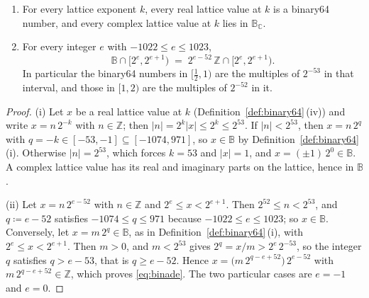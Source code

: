 
\begin{lemma}\label{lem:binary64-lattice}
\begin{enumerate}[label=(\roman*),leftmargin=2.4em]
\item For every lattice exponent $k$, every real lattice value at $k$ is a
  binary64 number, and every complex lattice value at $k$ lies in
  $\mathbb{B}_{\mathbb{C}}$.
\item For every integer $e$ with $-1022\le e\le1023$,
  \begin{equation}\label{eq:binade}
    \mathbb{B}\cap\big[2^{e},2^{e+1}\big)
    \;=\;2^{e-52}\,\mathbb{Z}\cap\big[2^{e},2^{e+1}\big).
  \end{equation}
  In particular the binary64 numbers in $[\tfrac12,1)$ are the multiples of
  $2^{-53}$ in that interval, and those in $[1,2)$ are the multiples of
  $2^{-52}$ in it.
\end{enumerate}
\end{lemma}

\begin{proof}
(i) Let $x$ be a real lattice value at $k$ (Definition~\ref{def:binary64}\,(iv))
and write $x=n\,2^{-k}$ with $n\in\mathbb{Z}$; then
$|n|=2^{k}|x|\le2^{k}\le2^{53}$. If $|n|<2^{53}$, then $x=n\,2^{q}$ with
$q=-k\in[-53,-1]\subseteq[-1074,971]$, so $x\in\mathbb{B}$ by
Definition~\ref{def:binary64}\,(i). Otherwise $|n|=2^{53}$, which forces
$k=53$ and $|x|=1$, and $x=(\pm1)\,2^{0}\in\mathbb{B}$. A complex lattice value
has its real and imaginary parts on the lattice, hence in $\mathbb{B}$.

(ii) Let $x=n\,2^{e-52}$ with $n\in\mathbb{Z}$ and $2^{e}\le x<2^{e+1}$. Then
$2^{52}\le n<2^{53}$, and $q\coloneqq e-52$ satisfies $-1074\le q\le971$
because $-1022\le e\le1023$; so $x\in\mathbb{B}$. Conversely, let
$x=m\,2^{q}\in\mathbb{B}$, as in Definition~\ref{def:binary64}\,(i), with
$2^{e}\le x<2^{e+1}$. Then $m>0$, and $m<2^{53}$ gives
$2^{q}=x/m>2^{e}\,2^{-53}$, so the integer $q$ satisfies $q>e-53$, that is
$q\ge e-52$. Hence $x=\big(m\,2^{q-e+52}\big)\,2^{e-52}$ with
$m\,2^{q-e+52}\in\mathbb{Z}$, which proves \eqref{eq:binade}. The two
particular cases are $e=-1$ and $e=0$.
\end{proof}
